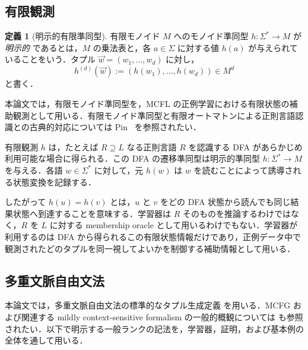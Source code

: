 \documentclass[11pt,a4paper]{ltjsarticle}
\numberwithin{equation}{section}
\theoremstyle{plain}
\theoremstyle{definition}
\newtheorem{definition}[theorem]{定義}
\theoremstyle{remark}
\newcommand{\tuple}[1]{\vec{#1}}
\begin{document}
\subsection{有限観測}

\begin{definition}[明示的有限準同型]
\label{def-monoid-morphism}
有限モノイド $M$ へのモノイド準同型 $h\colon\Sigma^*\to M$ が \emph{明示的} であるとは，$M$ の乗法表と，各 $a\in\Sigma$ に対する値 $h(a)$ が与えられていることをいう．タプル $\tuple w=(w_1,\ldots,w_d)$ に対し，
\[
h^{(d)}(\tuple w):=(h(w_1),\ldots,h(w_d))\in M^d
\]
と書く．
\end{definition}

本論文では，有限モノイド準同型を，MCFL の正例学習における有限状態の補助観測として用いる．有限モノイド準同型と有限オートマトンによる正則言語認識との古典的対応については Pin~\cite{Pin1986} を参照されたい．

有限観測 $h$ は，たとえば $R\supseteq L$ なる正則言語 $R$ を認識する DFA があらかじめ利用可能な場合に得られる．この DFA の遷移準同型は明示的準同型 $h:\Sigma^*\to M$ を与える．各語 $w\in\Sigma^*$ に対して，元 $h(w)$ は $w$ を読むことによって誘導される状態変換を記録する．

したがって $h(u)=h(v)$ とは，$u$ と $v$ をどの DFA 状態から読んでも同じ結果状態へ到達することを意味する．学習器は $R$ そのものを推論するわけではなく，$R$ を $L$ に対する membership oracle として用いるわけでもない．学習器が利用するのは DFA から得られるこの有限状態情報だけであり，正例データ中で観測されたどのタプルを同一視してよいかを制御する補助情報として用いる．

\subsection{多重文脈自由文法}

本論文では，多重文脈自由文法の標準的なタプル生成定義
\cite{SekiEtAl1991} を用いる．MCFG および関連する mildly context-sensitive formalism の一般的概観については \cite{Kallmeyer2010} も参照されたい．以下で明示する一般ランクの記法を，学習器，証明，および基本例の全体を通して用いる．
\end{document}
